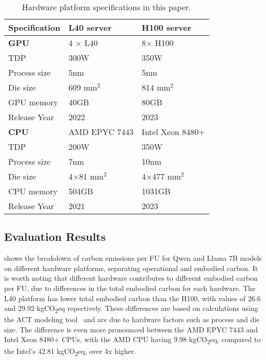 \begin{table}[!t]
    \centering
    \caption{Hardware platform specifications in this paper.}
    \footnotesize
    \begin{tabular}{l|p{2.5cm}|p{2.5cm}}
        \toprule
        \textbf{Specification} & \textbf{L40 server} & \textbf{H100 server} \\
        \midrule        
        \textbf{GPU} & 4 $\times$ L40 & 8$\times$ H100 \\
        \footnotesize{TDP} & \footnotesize{300W} & \footnotesize{350W} \\
        \footnotesize{Process size} & \footnotesize{5nm} & \footnotesize{5nm} \\
        \footnotesize{Die size} & \footnotesize{609 mm$^2$} & \footnotesize{814 mm$^2$} \\
        \footnotesize{GPU memory} & \footnotesize{40GB} & \footnotesize{80GB} \\
        \footnotesize{Release Year} & \footnotesize{2022} & \footnotesize{2023} \\
        \hline
        \textbf{CPU} & AMD EPYC 7443 & Intel Xeon 8480+ \\
        \footnotesize{TDP} & \footnotesize{200W} & \footnotesize{350W} \\
        \footnotesize{Process size} & \footnotesize{7nm} & \footnotesize{10nm} \\
        \footnotesize{Die size} & \footnotesize{4$\times$81 mm$^2$} & \footnotesize{4$\times$477 mm$^2$} \\
        \footnotesize{CPU memory} & 504GB & 1031GB \\
         \footnotesize{Release Year} & \footnotesize{2021} & \footnotesize{2023} \\
        \bottomrule
    \end{tabular}
    \label{tab:hardware_specifications}
\end{table}

\subsection{Evaluation Results}


\noindent {} shows the breakdown of carbon emissions per FU for Qwen and Llama 7B models on different hardware platforms, separating operational and embodied carbon. It is worth noting that different hardware contributes to different embodied carbon per FU, due to differences in the total embodied carbon for each hardware. The L40 platform has lower total embodied carbon than the H100, with values of 26.6 and 29.92 kgCO\textsubscript{2}eq repectively. These differences are based on calculations using the ACT modeling tool~\cite{gupta2022act} and are due to hardware factors such as process and die size. The difference is even more pronounced between the AMD EPYC 7443 and Intel Xeon 8480+ CPUs, with the AMD CPU having 9.98 kgCO\textsubscript{2}eq, compared to the Intel's 42.81 kgCO\textsubscript{2}eq, over 4x higher.

